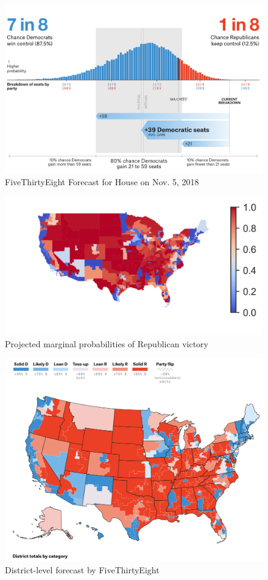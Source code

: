 \documentclass[12pt, letterpaper]{article}
\begin{document}
\begin{figure}[tbh]
  \centering
  \includegraphics[scale=0.4]{538_hist}
  \caption{FiveThirtyEight Forecast for House on Nov. 5, 2018}
  \label{fig:538_hist}
\end{figure}

\begin{figure}[tbh]
  \centering
  \includegraphics[scale=1.7]{projected_map.png}
  \caption{Projected marginal probabilities of Republican victory}
  \label{fig:proj_map}
\end{figure}

\begin{figure}[tbh]
  \centering
  \includegraphics[scale=0.45]{538_map}
  \caption{District-level forecast by FiveThirtyEight}
  \label{fig:538_map}
\end{figure}
\end{document}
